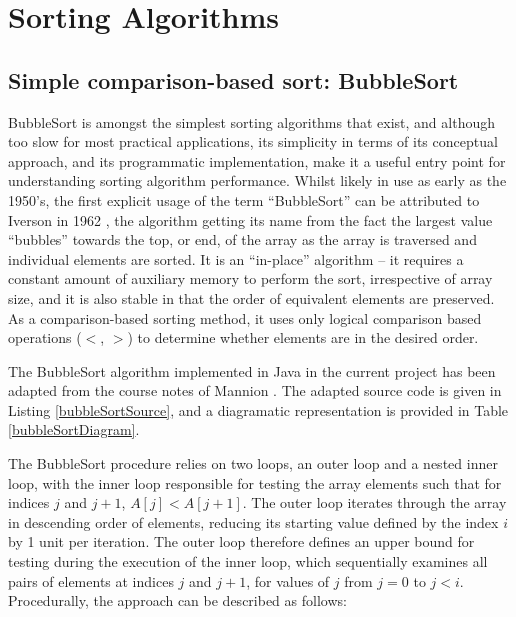 \documentclass[12pt,a4paper]{article}
\begin{document}
\section{Sorting Algorithms}

\subsection{Simple comparison-based sort: BubbleSort}
BubbleSort is amongst the simplest sorting algorithms that exist, and although too slow for most practical applications, its simplicity in terms of its conceptual approach, and its programmatic implementation, make it a useful entry point for understanding sorting algorithm performance. Whilst likely in use as early as the 1950's, the first explicit usage of the term ``BubbleSort'' can be attributed to Iverson in 1962 \cite{iverson_programming_1962}, the algorithm getting its name from the fact the largest value ``bubbles'' towards the top, or end, of the array as the array is traversed and individual elements are sorted. It is an ``in-place'' algorithm -- it requires a constant amount of auxiliary memory to perform the sort, irrespective of array size, and it is also stable in that the order of equivalent elements are preserved. As a comparison-based sorting method, it uses only logical comparison based operations ($<$, $>$) to determine whether elements are in the desired order.

The BubbleSort algorithm implemented in Java in the current project has been adapted from the course notes of Mannion \cite{mannionBubbleSort}. The adapted source code is given in Listing \ref{bubbleSortSource}, and a diagramatic representation is provided in Table \ref{bubbleSortDiagram}. 

The BubbleSort procedure relies on two loops, an outer loop and a nested inner loop, with the inner loop responsible for testing the array elements such that for indices $j$ and $j+1$, $A[j] < A[j+1]$. The outer loop iterates through the array in descending order of elements, reducing its starting value defined by the index $i$ by 1 unit per iteration. The outer loop therefore defines an upper bound for testing during the execution of the inner loop, which sequentially examines all pairs of elements at indices $j$ and $j+1$, for values of $j$ from $j = 0$ to $j < i$. Procedurally, the approach can be described as follows:
\end{document}
